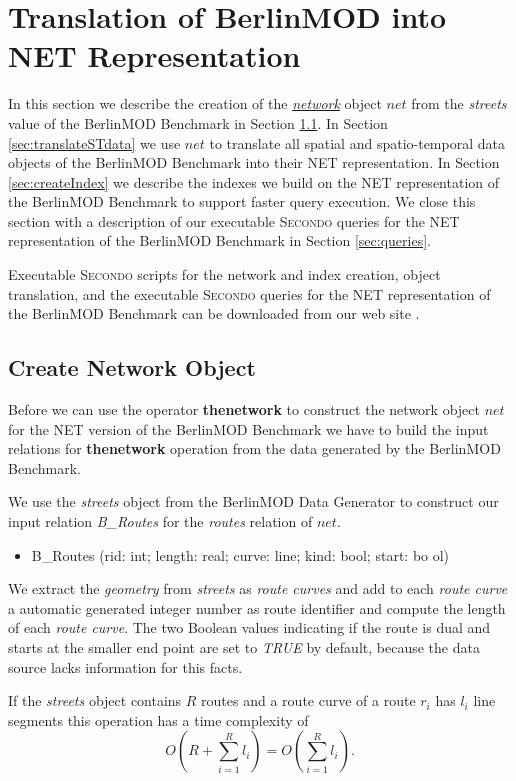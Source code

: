 \documentclass[a4paper]{article}
\newcommand{\secondo}{\textsc{Secondo}}
\newcommand{\bmodb} {BerlinMOD Benchmark}
\newcommand{\op}[1]{\textbf{#1}}
\newcommand{\dt}[1]{\textsl{\underline{#1}}}
\newcommand{\true}{\textsl{TRUE}}
\begin{document}
\section{Translation of BerlinMOD into NET Representation}
\label{sec:Translation}
In this section we describe the creation of the \dt{network} object $net$ from
the \textit{streets} value of the \bmodb{} in Section \ref{sec:createNetwork}. In
Section \ref{sec:translateSTdata} we use $net$ to translate all spatial and
spatio-temporal data objects of the \bmodb{} into their NET representation.
In Section \ref{sec:createIndex} we describe the indexes we build on the
NET representation of the \bmodb{} to support faster query execution.
We close this section with a description of our
executable \secondo{} queries for the NET representation of the \bmodb{} in
Section \ref{sec:queries}.

Executable \secondo{} scripts for the network and index creation, object
translation, and the executable \secondo{} queries for the NET
representation of the \bmodb{} can be downloaded from our web site
\cite{NetworkWeb}.
\subsection{Create Network Object}
\label{sec:createNetwork}
Before we can use the operator \op{thenetwork} to construct the network object
$net$ for the NET version of the \bmodb{} we have to build the input relations
for \op{thenetwork} operation from the data generated by the \bmodb{}.

We use the \textit{streets} object from the BerlinMOD Data Generator to
construct our input relation \textit{B\_Routes} for the \textit{routes} relation of
$net$.
\begin{ttfamily}
\begin{itemize}
  \item []B\_Routes (rid: int; length: real; curve: line; kind: bool; start: bo
ol)
\end{itemize}
\end{ttfamily}
We extract the \textit{geometry} from \textit{streets} as \textit{route curves} and add to
each \textit{route curve} a automatic generated integer number as route
identifier and compute the length of each \textit{route curve}. The two Boolean
values indicating if the route is dual and starts at the smaller end point are
set to \true{} by default, because the data source lacks information for this facts.

If the \textit{streets} object contains $R$ routes and a route curve of a route $r_i$ has
$l_i$ line segments this operation has a time complexity of
\[O(R + \sum_{i=1}^{R}{l_i}) = O(\sum_{i=1}^{R}{l_i}).\]
\end{document}
